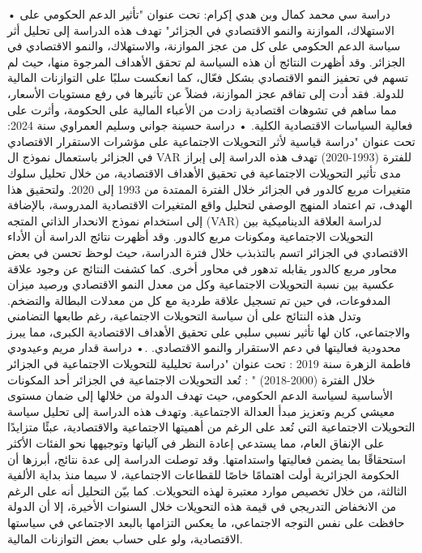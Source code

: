 \documentclass[12pt,a4paper]{report}
\begin{document}
• دراسة سي محمد كمال وبن هدي إكرام: تحت عنوان "تأثير الدعم الحكومي على الاستهلاك، الموازنة والنمو الاقتصادي في الجزائر" تهدف هذه الدراسة إلى تحليل أثر سياسة الدعم الحكومي على كل من عجز الموازنة، والاستهلاك، والنمو الاقتصادي في الجزائر. وقد أظهرت النتائج أن هذه السياسة لم تحقق الأهداف المرجوة منها، حيث لم تسهم في تحفيز النمو الاقتصادي بشكل فعّال، كما انعكست سلبًا على التوازنات المالية للدولة. فقد أدت إلى تفاقم عجز الموازنة، فضلاً عن تأثيرها في رفع مستويات الأسعار، مما ساهم في تشوهات اقتصادية زادت من الأعباء المالية على الحكومة، وأثرت على فعالية السياسات الاقتصادية الكلية. 
• دراسة حسينة جواني وسليم العمراوي سنة 2024: تحت عنوان "دراسة قياسية لأثر التحويلات الاجتماعية على مؤشرات الاستقرار الاقتصادي في الجزائر باستعمال نموذج ال VAR للفترة (1993-2020) تهدف هذه الدراسة إلى إبراز مدى تأثير التحويلات الاجتماعية في تحقيق الأهداف الاقتصادية، من خلال تحليل سلوك متغيرات مربع كالدور في الجزائر خلال الفترة الممتدة من 1993 إلى 2020. ولتحقيق هذا الهدف، تم اعتماد المنهج الوصفي لتحليل واقع المتغيرات الاقتصادية المدروسة، بالإضافة إلى استخدام نموذج الانحدار الذاتي المتجه (VAR) لدراسة العلاقة الديناميكية بين التحويلات الاجتماعية ومكونات مربع كالدور.
وقد أظهرت نتائج الدراسة أن الأداء الاقتصادي في الجزائر اتسم بالتذبذب خلال فترة الدراسة، حيث لوحظ تحسن في بعض محاور مربع كالدور يقابله تدهور في محاور أخرى. كما كشفت النتائج عن وجود علاقة عكسية بين نسبة التحويلات الاجتماعية وكل من معدل النمو الاقتصادي ورصيد ميزان المدفوعات، في حين تم تسجيل علاقة طردية مع كل من معدلات البطالة والتضخم. وتدل هذه النتائج على أن سياسة التحويلات الاجتماعية، رغم طابعها التضامني والاجتماعي، كان لها تأثير نسبي سلبي على تحقيق الأهداف الاقتصادية الكبرى، مما يبرز محدودية فعاليتها في دعم الاستقرار والنمو الاقتصادي.
.• دراسة قدار مريم وعيدودي فاطمة الزهرة سنة 2019 : تحت عنوان "دراسة تحليلية للتحويلات الاجتماعية في الجزائر خلال الفترة (2000-2018) " : تُعد التحويلات الاجتماعية في الجزائر أحد المكونات الأساسية لسياسة الدعم الحكومي، حيث تهدف الدولة من خلالها إلى ضمان مستوى معيشي كريم وتعزيز مبدأ العدالة الاجتماعية. وتهدف هذه الدراسة إلى تحليل سياسة التحويلات الاجتماعية التي تُعد على الرغم من أهميتها الاجتماعية والاقتصادية، عبئًا متزايدًا على الإنفاق العام، مما يستدعي إعادة النظر في آلياتها وتوجيهها نحو الفئات الأكثر استحقاقًا بما يضمن فعاليتها واستدامتها. 
وقد توصلت الدراسة إلى عدة نتائج، أبرزها أن الحكومة الجزائرية أولت اهتمامًا خاصًا للقطاعات الاجتماعية، لا سيما منذ بداية الألفية الثالثة، من خلال تخصيص موارد معتبرة لهذه التحويلات. كما بيّن التحليل أنه على الرغم من الانخفاض التدريجي في قيمة هذه التحويلات خلال السنوات الأخيرة، إلا أن الدولة حافظت على نفس التوجه الاجتماعي، ما يعكس التزامها بالبعد الاجتماعي في سياستها الاقتصادية، ولو على حساب بعض التوازنات المالية.
\end{document}
